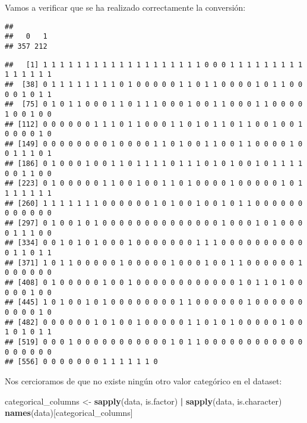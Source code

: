 \documentclass[
]{article}
\newenvironment{Shaded}{\begin{snugshade}}{\end{snugshade}}
\newcommand{\FunctionTok}[1]{\textcolor[rgb]{0.13,0.29,0.53}{\textbf{#1}}}
\newcommand{\NormalTok}[1]{#1}
\newcommand{\OtherTok}[1]{\textcolor[rgb]{0.56,0.35,0.01}{#1}}
\newcommand{\SpecialCharTok}[1]{\textcolor[rgb]{0.81,0.36,0.00}{\textbf{#1}}}
\begin{document}
Vamos a verificar que se ha realizado correctamente la conversión:

\begin{Shaded}
\end{Shaded}

\begin{verbatim}
## 
##   0   1 
## 357 212
\end{verbatim}

\begin{Shaded}
\end{Shaded}

\begin{verbatim}
##   [1] 1 1 1 1 1 1 1 1 1 1 1 1 1 1 1 1 1 1 1 0 0 0 1 1 1 1 1 1 1 1 1 1 1 1 1 1 1
##  [38] 0 1 1 1 1 1 1 1 1 0 1 0 0 0 0 0 1 1 0 1 1 0 0 0 0 1 0 1 1 0 0 0 0 1 0 1 1
##  [75] 0 1 0 1 1 0 0 0 1 1 0 1 1 1 0 0 0 1 0 0 1 1 0 0 0 1 1 0 0 0 0 1 0 0 1 0 0
## [112] 0 0 0 0 0 0 1 1 1 0 1 1 0 0 0 1 1 0 1 0 1 1 0 1 1 0 0 1 0 0 1 0 0 0 0 1 0
## [149] 0 0 0 0 0 0 0 0 1 0 0 0 0 1 1 0 1 0 0 1 1 0 0 1 1 0 0 0 0 1 0 0 1 1 1 0 1
## [186] 0 1 0 0 0 1 0 0 1 1 0 1 1 1 1 0 1 1 1 0 1 0 1 0 0 1 0 1 1 1 1 0 0 1 1 0 0
## [223] 0 1 0 0 0 0 0 1 1 0 0 1 0 0 1 1 0 1 0 0 0 0 1 0 0 0 0 0 1 0 1 1 1 1 1 1 1
## [260] 1 1 1 1 1 1 1 0 0 0 0 0 0 1 0 1 0 0 1 0 0 1 0 1 1 0 0 0 0 0 0 0 0 0 0 0 0
## [297] 0 1 0 0 1 0 1 0 0 0 0 0 0 0 0 0 0 0 0 0 0 1 0 0 0 1 0 1 0 0 0 0 1 1 1 0 0
## [334] 0 0 1 0 1 0 1 0 0 0 1 0 0 0 0 0 0 0 1 1 1 0 0 0 0 0 0 0 0 0 0 0 1 1 0 1 1
## [371] 1 0 1 1 0 0 0 0 0 1 0 0 0 0 0 1 0 0 0 1 0 0 1 1 0 0 0 0 0 0 1 0 0 0 0 0 0
## [408] 0 1 0 0 0 0 0 1 0 0 1 0 0 0 0 0 0 0 0 0 0 0 0 1 0 1 1 0 1 0 0 0 0 0 1 0 0
## [445] 1 0 1 0 0 1 0 1 0 0 0 0 0 0 0 0 1 1 0 0 0 0 0 0 1 0 0 0 0 0 0 0 0 0 0 1 0
## [482] 0 0 0 0 0 0 1 0 1 0 0 1 0 0 0 0 0 1 1 0 1 0 1 0 0 0 0 0 1 0 0 1 0 1 0 1 1
## [519] 0 0 0 1 0 0 0 0 0 0 0 0 0 0 0 1 0 1 1 0 0 0 0 0 0 0 0 0 0 0 0 0 0 0 0 0 0
## [556] 0 0 0 0 0 0 0 1 1 1 1 1 1 0
\end{verbatim}

Nos cercioramos de que no existe ningún otro valor categórico en el
dataset:

\begin{Shaded}
\begin{Highlighting}[]
\NormalTok{categorical\_columns }\OtherTok{\textless{}{-}} \FunctionTok{sapply}\NormalTok{(data, is.factor) }\SpecialCharTok{|} \FunctionTok{sapply}\NormalTok{(data, is.character)}
\FunctionTok{names}\NormalTok{(data)[categorical\_columns]}
\end{Highlighting}
\end{Shaded}
\end{document}
